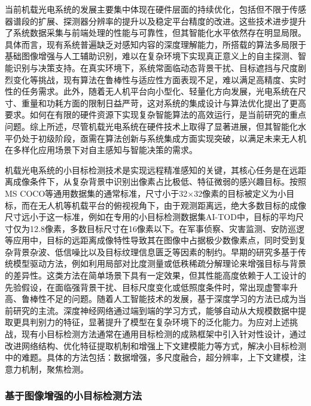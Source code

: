当前机载光电系统的发展主要集中体现在硬件层面的持续优化，包括但不限于传感器谱段的扩展、探测器分辨率的提升以及稳定平台精度的改进。这些技术进步提升了系统数据采集与前端处理的性能与可靠性，但其智能化水平依然存在明显局限。具体而言，现有系统普遍缺乏对感知内容的深度理解能力，所搭载的算法多局限于基础图像增强与人工辅助识别，难以在复杂环境下实现真正意义上的自主探测、智能识别与决策支持。在真实环境下，系统常面临动态背景干扰、目标遮挡与尺度剧烈变化等挑战，现有算法在鲁棒性与适应性方面表现不足，难以满足高精度、实时性的任务需求。此外，随着无人机平台向小型化、轻量化方向发展，光电系统在尺寸、重量和功耗方面的限制日益严苛，这对系统的集成设计与算法优化提出了更高要求。如何在有限的硬件资源下实现复杂智能算法的高效运行，是当前研究的重点问题。综上所述，尽管机载光电系统在硬件技术上取得了显著进展，但其智能化水平仍处于初级阶段，亟需在算法创新与系统集成方面实现突破，以满足未来无人机在多样化应用场景下对自主感知与智能决策的需求。


机载光电系统的小目标检测技术是实现远程精准感知的关键，其核心任务是在远距离成像条件下，从复杂背景中识别出像素占比极低、特征微弱的感兴趣目标。按照MS COCO等通用数据集的通常标准，尺寸小于32×32像素的目标被定义为小目标，而在无人机等机载平台的俯视视角下，由于观测距离远，绝大多数目标的成像尺寸远小于这一标准，例如在专用的小目标检测数据集AI-TOD中，目标的平均尺寸仅为12.8像素，多数目标尺寸在16像素以下。在军事侦察、灾害监测、安防巡逻等应用中，目标的远距离成像特性导致其在图像中占据极少数像素点，同时受到复杂背景杂波、低信噪比以及目标纹理信息匮乏等因素的制约\cite{HKXB20251110005}。早期的研究多基于传统模型驱动方法，例如利用局部对比度测量或低秩稀疏分解理论来增强目标与背景的差异性。这类方法在简单场景下具有一定效果，但其性能高度依赖于人工设计的先验假设，在面临强背景干扰、目标尺度变化或低照度条件时，常出现虚警率升高、鲁棒性不足的问题。随着人工智能技术的发展，基于深度学习的方法已成为当前研究的主流\cite{HKXB202318001}。深度神经网络通过端到端的学习方式，能够自动从大规模数据中提取更具判别力的特征，显著提升了模型在复杂环境下的泛化能力。为应对上述挑战，现有小目标检测方法通常在通用目标检测的成熟框架中引入针对性设计，通过改进网络结构、优化特征提取机制和增强上下文建模能力等方式，解决小目标检测中的难题。具体的方法包括：数据增强，多尺度融合，超分辨率，上下文建模，注意力机制，聚焦检测。

\subsubsection{基于图像增强的小目标检测方法}

